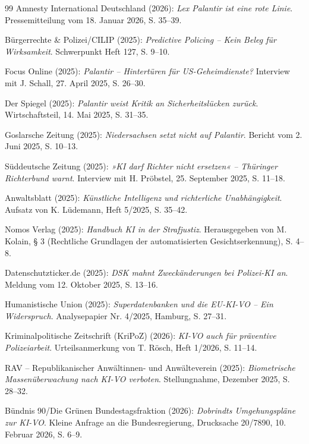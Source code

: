 \documentclass[12pt,a4paper]{article}
\begin{document}
\begin{thebibliography}{99}
		 Amnesty International Deutschland (2026): \emph{Lex Palantir ist eine rote Linie}. Pressemitteilung vom 18. Januar 2026, S. 35–39.
		
		 Bürgerrechte \& Polizei/CILIP (2025): \emph{Predictive Policing – Kein Beleg für Wirksamkeit}. Schwerpunkt Heft 127, S. 9–10.
		
		 Focus Online (2025): \emph{Palantir – Hintertüren für US-Geheimdienste?} Interview mit J. Schall, 27. April 2025, S. 26–30.
		
		 Der Spiegel (2025): \emph{Palantir weist Kritik an Sicherheitslücken zurück}. Wirtschaftsteil, 14. Mai 2025, S. 31–35.
		
		 Goslarsche Zeitung (2025): \emph{Niedersachsen setzt nicht auf Palantir}. Bericht vom 2. Juni 2025, S. 10–13.
		
		 Süddeutsche Zeitung (2025): \emph{»KI darf Richter nicht ersetzen« – Thüringer Richterbund warnt}. Interview mit H. Pröbstel, 25. September 2025, S. 11–18.
		
		 Anwaltsblatt (2025): \emph{Künstliche Intelligenz und richterliche Unabhängigkeit}. Aufsatz von K. Lüdemann, Heft 5/2025, S. 35–42.
		
		 Nomos Verlag (2025): \emph{Handbuch KI in der Strafjustiz}. Herausgegeben von M. Kolain, § 3 (Rechtliche Grundlagen der automatisierten Gesichtserkennung), S. 4–8.
		
		 Datenschutzticker.de (2025): \emph{DSK mahnt Zweckänderungen bei Polizei-KI an}. Meldung vom 12. Oktober 2025, S. 13–16.
		
		 Humanistische Union (2025): \emph{Superdatenbanken und die EU-KI-VO – Ein Widerspruch}. Analysepapier Nr. 4/2025, Hamburg, S. 27–31.
		
		 Kriminalpolitische Zeitschrift (KriPoZ) (2026): \emph{KI-VO auch für präventive Polizeiarbeit}. Urteilsanmerkung von T. Rösch, Heft 1/2026, S. 11–14.
		
		 RAV – Republikanischer Anwältinnen- und Anwälteverein (2025): \emph{Biometrische Massenüberwachung nach KI-VO verboten}. Stellungnahme, Dezember 2025, S. 28–32.
		
		 Bündnis 90/Die Grünen Bundestagsfraktion (2026): \emph{Dobrindts Umgehungspläne zur KI-VO}. Kleine Anfrage an die Bundesregierung, Drucksache 20/7890, 10. Februar 2026, S. 6–9.
		

\end{thebibliography}
\end{document}
